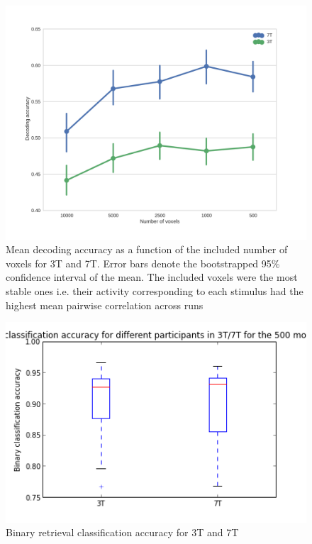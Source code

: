 \begin{figure}
  \centering
  \includegraphics[width=\linewidth]{pics/nr_of_voxels_both}

  \caption{Mean decoding accuracy as a function of the included number of
  voxels for 3T and 7T. Error bars denote the bootstrapped 95\% confidence
  interval of the mean. The included voxels were the most stable ones i.e. their
  activity corresponding to each stimulus had the highest mean pairwise
  correlation across runs}

 \label{fig:voxelnr}
\end{figure}

\begin{figure}
  \centering
  \includegraphics[width=\linewidth]{pics/binary_retrieval_accuracy}
  \caption{Binary retrieval classification accuracy for 3T and 7T}
  \label{fig:binretr}
\end{figure}

